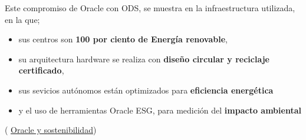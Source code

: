 Este compromiso de Oracle con \acrshort{ODS}, se muestra en la infraestructura utilizada, en la que; 
\begin{itemize}
	\item sus centros son \textbf{100 por ciento de Energía renovable}, 
	\item su arquitectura hardware se realiza con \textbf{diseño circular y reciclaje certificado}, 
	\item sus sevicios autónomos están optimizados para \textbf{eficiencia energética}
	\item y el uso de herramientas Oracle ESG, para medición del \textbf{impacto ambiental}
\end{itemize}	( \href{https://www.oracle.com/es/sustainability/}{Oracle y sostenibilidad})